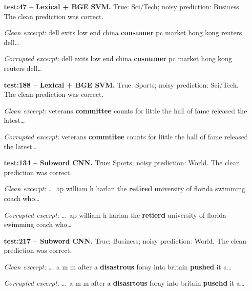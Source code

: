 \par\noindent\begin{minipage}{\linewidth}
\noindent\textbf{test:47 -- Lexical + BGE SVM.} True: Sci/Tech; noisy prediction: Business. The clean prediction was correct.

\textit{Clean excerpt:} dell exits low end china \textbf{consumer} pc market hong kong reuters dell\ldots\par
\textit{Corrupted excerpt:} dell exits low end china \textbf{cosnumer} pc market hong kong reuters dell\ldots\par
\end{minipage}\par\medskip

\par\noindent\begin{minipage}{\linewidth}
\noindent\textbf{test:188 -- Lexical + BGE SVM.} True: Sports; noisy prediction: Sci/Tech. The clean prediction was correct.

\textit{Clean excerpt:} veterans \textbf{committee} counts for little the hall of fame released the latest\ldots\par
\textit{Corrupted excerpt:} veterans \textbf{commtitee} counts for little the hall of fame released the latest\ldots\par
\end{minipage}\par\medskip

\par\noindent\begin{minipage}{\linewidth}
\noindent\textbf{test:134 -- Subword CNN.} True: Sports; noisy prediction: World. The clean prediction was correct.

\textit{Clean excerpt:} \ldots\ ap william h harlan the \textbf{retired} university of florida swimming coach who\ldots\par
\textit{Corrupted excerpt:} \ldots\ ap william h harlan the \textbf{retierd} university of florida swimming coach who\ldots\par
\end{minipage}\par\medskip

\par\noindent\begin{minipage}{\linewidth}
\noindent\textbf{test:217 -- Subword CNN.} True: Business; noisy prediction: World. The clean prediction was correct.

\textit{Clean excerpt:} \ldots\ a m m after a \textbf{disastrous} foray into britain \textbf{pushed} it a\ldots\par
\textit{Corrupted excerpt:} \ldots\ a m m after a \textbf{disasrtous} foray into britain \textbf{pusehd} it a\ldots\par
\end{minipage}\par\medskip



